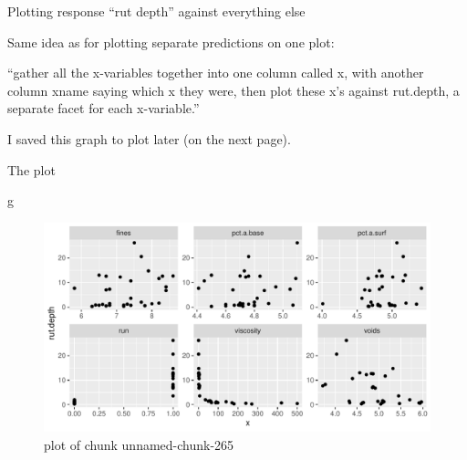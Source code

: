 \documentclass[ignorenonframetext,]{beamer}
\newenvironment{Shaded}{\begin{snugshade}}{\end{snugshade}}
\newcommand{\DataTypeTok}[1]{\textcolor[rgb]{0.13,0.29,0.53}{#1}}
\newcommand{\KeywordTok}[1]{\textcolor[rgb]{0.13,0.29,0.53}{\textbf{#1}}}
\newcommand{\NormalTok}[1]{#1}
\newcommand{\OperatorTok}[1]{\textcolor[rgb]{0.81,0.36,0.00}{\textbf{#1}}}
\newcommand{\StringTok}[1]{\textcolor[rgb]{0.31,0.60,0.02}{#1}}
\begin{document}
\begin{frame}[fragile]{Plotting response ``rut depth'' against
everything else}
\protect\hypertarget{plotting-response-rut-depth-against-everything-else}{}

Same idea as for plotting separate predictions on one plot:

\begin{Shaded}
\end{Shaded}

``gather all the x-variables together into one column called x, with
another column xname saying which x they were, then plot these x's
against rut.depth, a separate facet for each x-variable.''

I saved this graph to plot later (on the next page).

\end{frame}

\begin{frame}[fragile]{The plot}
\protect\hypertarget{the-plot-2}{}

\begin{Shaded}
\begin{Highlighting}[]
\NormalTok{g}
\end{Highlighting}
\end{Shaded}

\begin{figure}
\centering
\includegraphics{figure/unnamed-chunk-265-1.pdf}
\caption{plot of chunk unnamed-chunk-265}
\end{figure}

\end{frame}
\end{document}
